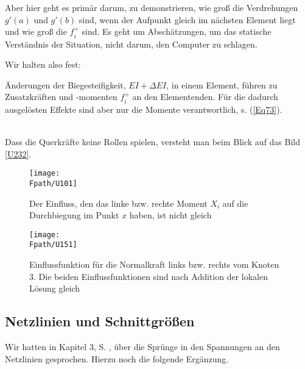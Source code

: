 {{{{{{{Aber hier geht es prim\"{a}r darum, zu demonstrieren, wie gro{\ss} die Verdrehungen $g'(a)$ und $g'(b)$ sind, wenn der Aufpunkt gleich im n\"{a}chsten Element liegt und wie gro{\ss} die $f_i^+$ sind. Es geht um Absch\"{a}tzungen, um das statische Verst\"{a}ndnis der Situation, nicht darum, den Computer zu schlagen.

Wir halten also fest: \\

\hspace*{-12pt}\colorbox{hellgrau}{\parbox{0.98\textwidth}{\"{A}nderungen der Biegesteifigkeit, $EI + \Delta EI $, in einem Element, f\"{u}hren zu Zusatzkr\"{a}ften und -momenten $f_i^+$ an den Elementenden. F\"{u}r die dadurch ausgel\"{o}sten Effekte sind aber nur die Momente verantwortlich, s. (\ref{Eq73}). }}\\

Dass die Querkr\"{a}fte keine Rollen spielen, versteht man beim Blick auf das Bild \ref{U232}.

\begin{figure}[tbp]
\centering
\texttt{[image: \\Fpath/U101]}
\caption{Der Einfluss, den das linke bzw. rechte Moment $X_i$ auf die Durchbiegung im Punkt $x$ haben, ist nicht gleich}
\label{U101}
\end{figure}%

\begin{figure}
\centering
\if {} \sidecaption \fi
\texttt{[image: \\Fpath/U151]}
\caption{Einflussfunktion f\"{u}r die Normalkraft links bzw. rechts vom Knoten 3. Die beiden Einflussfunktionen sind nach Addition der lokalen L\"{o}sung gleich}
\label{U151}%
\end{figure}%

{\textcolor{blau2}{\subsection{Netzlinien und Schnittgr\"{o}{\ss}en}}}
Wir hatten in Kapitel 3, S. \pageref{Jumps}, \"{u}ber die Spr\"{u}nge in den Spannungen an den Netzlinien gesprochen. Hierzu noch die folgende Erg\"{a}nzung.

}}}}}}}
